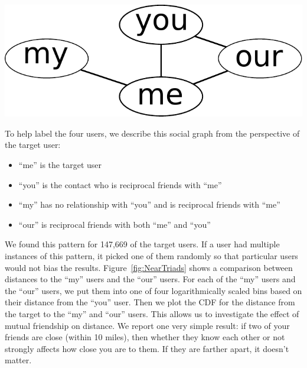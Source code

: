 \documentclass[letterpaper]{article}
\begin{document}
\begin{center}
\includegraphics[width=0.3\linewidth]{figures/near_triads_dia.pdf}
\end{center}

To help label the four users, we describe this social graph from the
perspective of the target user:

\begin{itemize}
\item ``me'' is the target user
\item ``you'' is the contact who is reciprocal friends with ``me''
\item ``my'' has no relationship with ``you'' and is reciprocal friends with ``me''
\item ``our'' is reciprocal friends with both ``me'' and ``you''
\end{itemize}

We found this pattern for 147,669 of the target users.
%
If a user had multiple instances of this pattern, it picked one of them
randomly so that particular users would not bias the results.
%
%
Figure~\ref{fig:NearTriads} shows a comparison between distances to the ``my''
users and the ``our'' users.
%
For each of the ``my'' users and the ``our'' users, we put them into one of
four logarithmically scaled bins based on their distance from the ``you'' user.
%
Then we plot the CDF for the distance from the target to the ``my'' and ``our'' users.
%
This allows us to investigate the effect of mutual friendship on distance.
We report one very simple result: if two of your friends are close (within 10
miles), then whether they know each other or not strongly affects how close
you are to them.
%
If they are farther apart, it doesn't matter.
\end{document}
